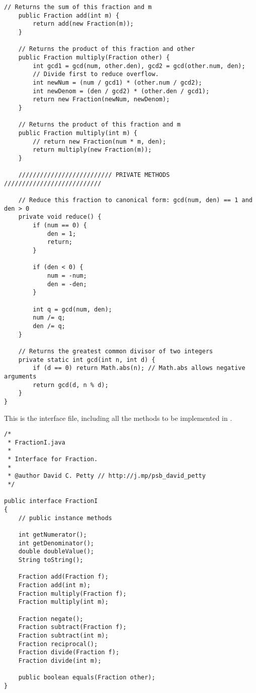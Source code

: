 \documentclass[11pt]{article}%
\begin{document}
\begin{lstlisting}[caption=\code{Fraction.java},label=Fraction]
    // Returns the sum of this fraction and m
    public Fraction add(int m) {
        return add(new Fraction(m));
    }

    // Returns the product of this fraction and other
    public Fraction multiply(Fraction other) {
        int gcd1 = gcd(num, other.den), gcd2 = gcd(other.num, den);
        // Divide first to reduce overflow.
        int newNum = (num / gcd1) * (other.num / gcd2);
        int newDenom = (den / gcd2) * (other.den / gcd1);
        return new Fraction(newNum, newDenom);
    }

    // Returns the product of this fraction and m
    public Fraction multiply(int m) {
        // return new Fraction(num * m, den);
        return multiply(new Fraction(m));
    }

    ////////////////////////// PRIVATE METHODS ///////////////////////////

    // Reduce this fraction to canonical form: gcd(num, den) == 1 and den > 0
    private void reduce() {
        if (num == 0) {
            den = 1;
            return;
        }
        
        if (den < 0) {
            num = -num;
            den = -den;
        }
        
        int q = gcd(num, den);
        num /= q;
        den /= q;
    }

    // Returns the greatest common divisor of two integers
    private static int gcd(int n, int d) {
        if (d == 0) return Math.abs(n); // Math.abs allows negative arguments
        return gcd(d, n % d);
    }
}\end{lstlisting}

This is the  interface file, including all the methods to be implemented in . \\

\begin{lstlisting}[caption=\code{\href{http://pastebin.com/ZDCKReZR}{FractionI.java}},label=FractionI]
/*
 * FractionI.java
 *
 * Interface for Fraction.
 *
 * @author David C. Petty // http://j.mp/psb_david_petty
 */

public interface FractionI
{ 
    // public instance methods

    int getNumerator();
    int getDenominator();
    double doubleValue();
    String toString();

    Fraction add(Fraction f);
    Fraction add(int m);
    Fraction multiply(Fraction f);
    Fraction multiply(int m);

    Fraction negate();
    Fraction subtract(Fraction f);
    Fraction subtract(int m);
    Fraction reciprocal();
    Fraction divide(Fraction f);
    Fraction divide(int m);

    public boolean equals(Fraction other);
}
\end{lstlisting}


\printbibliography

\end{document}
